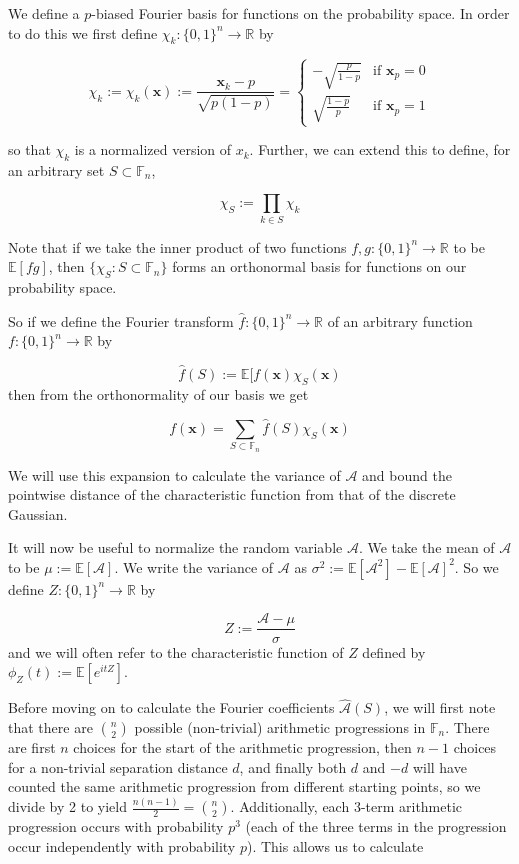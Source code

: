 \documentclass{article}
\newcommand{\ap}{\mathcal{A}}
\newcommand{\E}{\mathbb{E}}
\newcommand{\F}{\mathbb{F}}
\newcommand{\bbr}{\mathbb{R}}
\newcommand{\bfx}{\mathbf{x}}
\theoremstyle{definition}
\theoremstyle{remark}
\begin{document}
We define a $p$-biased Fourier basis for functions on the probability space. In order to do this we first define $\chi_k : \{0,1\}^n \to \bbr$ by

\[\chi_k := \chi_k(\bfx) := \frac{\bfx_k - p}{\sqrt{p(1-p)}} = \begin{cases} 
      -\sqrt{\frac{p}{1-p}} & \text{if } \bfx_p = 0 \\[10pt]
      \sqrt{\frac{1-p}{p}} & \text{if } \bfx_p = 1
\end{cases} \]

so that $\chi_k$ is a normalized version of $x_k$. Further, we can extend this to define, for an arbitrary set $S \subset \F_n$,

\[\chi_S := \prod_{k \in S} {\chi_k} \]

Note that if we take the inner product of two functions $f, g : \{0,1\}^n \to \bbr$ to be $\E[fg]$, then $\{\chi_S : S \subset \F_n\}$ forms an orthonormal basis for functions on our probability space.

So if we define the Fourier transform $\hat{f} : \{0,1\}^n \to \bbr$ of an arbitrary function $f : \{0,1\}^n \to \bbr$ by

\[\hat{f}(S) := \E[f(\bfx)\chi_S(\bfx)\]
then from the orthonormality of our basis we get

\[f(\bfx) = \sum_{S \subset \F_n} {\hat{f}(S)\chi_S(\bfx)}\]

We will use this expansion to calculate the variance of $\ap$ and bound the pointwise distance of the characteristic function from that of the discrete Gaussian.

It will now be useful to normalize the random variable $\ap$. We take the mean of $\ap$ to be $\mu := \E[\ap]$. We write the variance of $\ap$ as $\sigma^2 := \E[\ap^2] - \E[\ap]^2$. So we define $Z : \{0,1\}^n \to \bbr$ by

\[Z := \frac{\ap - \mu}{\sigma}\]
and we will often refer to the characteristic function of $Z$ defined by $\phi_Z(t) := \E[e^{itZ}]$.

Before moving on to calculate the Fourier coefficients $\hat{\ap}(S)$, we will first note that there are $\binom{n}{2}$ possible (non-trivial) arithmetic progressions in $\F_n$. There are first $n$ choices for the start of the arithmetic progression, then $n-1$ choices for a non-trivial separation distance $d$, and finally both $d$ and $-d$ will have counted the same arithmetic progression from different starting points, so we divide by 2 to yield $\frac{n(n-1)}{2} = \binom{n}{2}$. Additionally, each 3-term arithmetic progression occurs with probability $p^3$ (each of the three terms in the progression occur independently with probability $p$). This allows us to calculate
\end{document}

